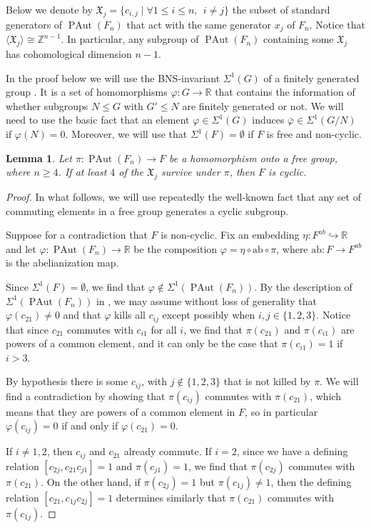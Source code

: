 \documentclass[10pt]{amsart}
\newtheorem{lemma}[theorem]{Lemma}
\theoremstyle{definition}
\newcommand{\Z}{\mathbb Z}
\newcommand{\R}{\mathbb R}
\newcommand{\X}{\mathfrak{X}}
\newcommand{\PAut}{\operatorname{PAut}}
\theoremstyle{definition}
\numberwithin{equation}{section}
\begin{document}
Below we denote by $\X_j = \{ c_{i,j} \mid \forall 1 \leq i \leq n, \ \ i \neq j\}$ the subset of standard generators of $\PAut(F_n)$ that act with the same generator $x_j$ of $F_n$. Notice that $\langle \X_j \rangle \cong \Z^{n-1}$. In particular, any subgroup of $\PAut(F_n)$ containing some $\X_j$ has cohomological dimension $n-1$.


In the proof below we will use the BNS-invariant $\Sigma^1(G)$ of a finitely generated group \cite{BNS}. It is a set of homomorphisms $\varphi \colon G \to \R$ that contains the information of whether subgroups $N\leq G$ with $G' \leq N$ are finitely generated or not. We will need to use the basic fact that an element $\varphi \in \Sigma^1(G)$ induces $\bar{\varphi} \in \Sigma^1(G/N)$ if $\varphi(N) = 0$. Moreover, we will use that $\Sigma^1(F) = \emptyset$ if $F$ is free and non-cyclic.

\begin{lemma} \label{epi.free}
 Let $\pi \colon \PAut(F_n) \to F$ be  a homomorphism onto a free group, where $n \geq 4$. If at least $4$ of the $\X_j$ survive under $\pi$, then $F$ is cyclic.
 \end{lemma}
%

 \begin{proof}
  In what follows, we will use repeatedly the well-known fact that any set of commuting elements in a free group  generates a cyclic subgroup.

  Suppose for  a contradiction that $F$ is non-cyclic. Fix an embedding $\eta \colon F^{ab} \hookrightarrow \R$ and let $\varphi \colon \PAut(F_n) \to \R$ be the composition $\varphi = \eta \circ \mathrm{ab} \circ \pi$, where $\mathrm{ab} \colon F \to F^{ab}$ is the abelianization map.


  Since $\Sigma^1(F) = \emptyset$, we find that $\varphi \notin \Sigma^1(\PAut(F_n))$. By the description of $\Sigma^1(\PAut(F_n))$ in \cite{OrlandiKorner}, we may assume without loss of generality that $\varphi(c_{21}) \neq 0$ and that $\varphi$ kills all $c_{ij}$ except possibly when $i,j \in \{1,2,3\}$.   Notice that since $c_{21}$ commutes with $c_{i1}$ for all $i$, we find that $\pi(c_{21})$ and $\pi(c_{i1})$ are powers of a common element, and it can only be the case that $\pi(c_{i1})= 1$ if $i>3$.



  By hypothesis there is some $c_{ij}$, with $j \notin \{1,2,3\}$ that is not killed by $\pi$.
  We will find a contradiction by showing that $\pi(c_{ij})$ commutes with $\pi(c_{21})$, which means that they are powers of a common element in $F$, so in particular $\varphi(c_{ij}) = 0 $ if and only if $\varphi(c_{21}) = 0$.



  If $i \neq 1,2$, then $c_{ij}$ and $c_{21}$ already commute. If $i=2$, since we have a defining relation $[c_{2j}, c_{21}c_{j1}]=1$ and $\pi(c_{j1})= 1$, we find that $\pi(c_{2j})$ commutes with $\pi(c_{21})$. On the other hand, if $\pi(c_{2j}) =1$ but $\pi(c_{1j})\neq 1$, then the defining relation $[c_{21}, c_{1j}c_{2j}]=1$ determines similarly that $\pi(c_{21})$ commutes with $\pi(c_{1j})$.
  \end{proof}
\end{document}
